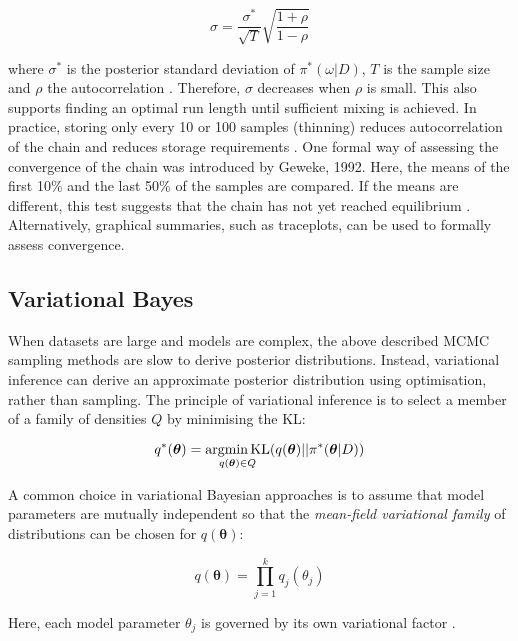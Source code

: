 \begin{equation}
\sigma=\frac{\sigma^*}{\sqrt{T}}\sqrt{\frac{1+\rho}{1-\rho}}
\end{equation}

where $\sigma^*$ is the posterior standard deviation of $\pi^*(\omega|D)$, $T$ is the sample size and $\rho$ the autocorrelation \citep{Tierney1991}. Therefore, $\sigma$ decreases when $\rho$ is small. This also supports finding an optimal run length until sufficient mixing is achieved. In practice, storing only every 10 or 100 samples (thinning) reduces autocorrelation of the chain and reduces storage requirements \citep{Greyer1992}. One formal way of assessing the convergence of the chain was introduced by Geweke, 1992. Here, the means of the first 10\% and the last 50\% of the samples are compared. If the means are different, this test suggests that the chain has not yet reached equilibrium \citep{Geweke1992}. Alternatively, graphical summaries, such as traceplots, can be used to formally assess convergence.

\subsection{Variational Bayes}

When datasets are large and models are complex, the above described MCMC sampling methods are slow to derive posterior distributions. Instead, variational inference can derive an approximate posterior distribution using optimisation, rather than sampling. The principle of variational inference is to select a member of a family of densities $Q$ by minimising the \gls{KL}:

\begin{equation}
q^\ast(\bm{\theta})=\underset{q(\bm{\theta})\in{}Q}{\textnormal{argmin\,{}KL}}(q(\bm{\theta})||\pi^*(\bm{\theta}|D))
\end{equation}

A common choice in variational Bayesian approaches is to assume that model parameters are mutually independent so that the \emph{mean-field variational family} of distributions can be chosen for $q(\bm{\theta})$:

\begin{equation}
q(\bm{\theta})=\prod_{j=1}^k{}q_j(\theta_j)
\end{equation}

Here, each model parameter $\theta_j$ is governed by its own variational factor \citep{Blei2017}.\\

